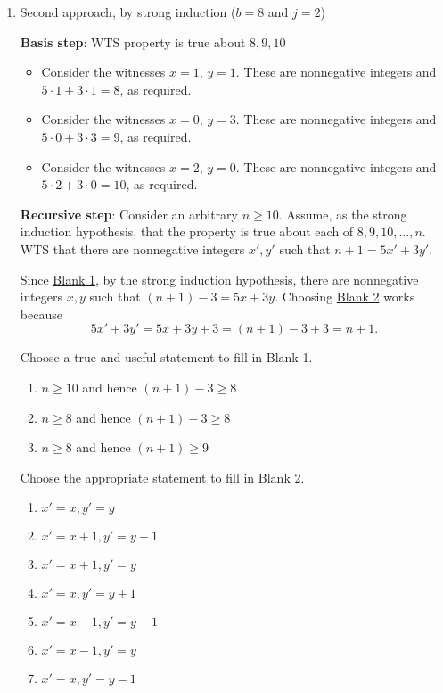 \documentclass[12pt, oneside]{article}
\begin{document}
\begin{enumerate}
\begin{enumerate}
\item  Second approach, by strong induction ($b=8$ and $j=2$)

{\bf Basis step}:  WTS property is true about  $8, 9, 10$
\begin{itemize}
\item Consider the witnesses $x = 1$, $y=1$. These 
are nonnegative integers and $5 \cdot 1 + 3 \cdot 1 = 8$, as
required.
\item Consider the witnesses $x = 0$, $y=3$. These 
are nonnegative integers and $5 \cdot 0 + 3 \cdot 3 = 9$, as
required.
\item Consider the witnesses $x = 2$, $y=0$. These 
are nonnegative integers and $5 \cdot 2 + 3 \cdot 0 = 10$, as
required.
\end{itemize}

{\bf Recursive step}: Consider an  arbitrary  $n \geq 10$.
Assume, as the strong induction hypothesis, 
that the property is true about each of $8, 9, 10, \ldots, n$.  
WTS
that there are nonnegative integers $x', y'$ such
that  $n+1 = 5x' +  3y'$. 

Since \underline{Blank 1}, 
by the strong induction hypothesis, there are nonnegative integers
$x, y$ such that $(n+1) - 3 = 5x + 3y$.
Choosing \underline{Blank 2} works because
\[
    5x' + 3y' = 5x + 3y + 3 = (n+1) - 3 + 3 = n+1.
\]

Choose a true and useful statement to fill in Blank 1.
    \begin{enumerate}
        \item $n \geq 10$ and hence $(n+1) - 3 \geq 8$
        \item $n \geq 8$ and hence $(n+1)-3 \geq 8$
        \item $n \geq 8$ and hence $(n+1) \geq 9$
    \end{enumerate}

Choose the appropriate statement to fill in Blank 2.
    \begin{enumerate}
        \item $x' = x, y' = y$
        \item $x' = x+1, y' = y+1$
        \item $x' = x+1, y' = y$
        \item $x' = x, y' = y+1$
        \item $x' = x-1, y' = y-1$
        \item $x' = x-1, y' = y$
        \item $x' = x, y' = y-1$
    \end{enumerate}
\end{enumerate}
 \end{enumerate}
\end{document}
